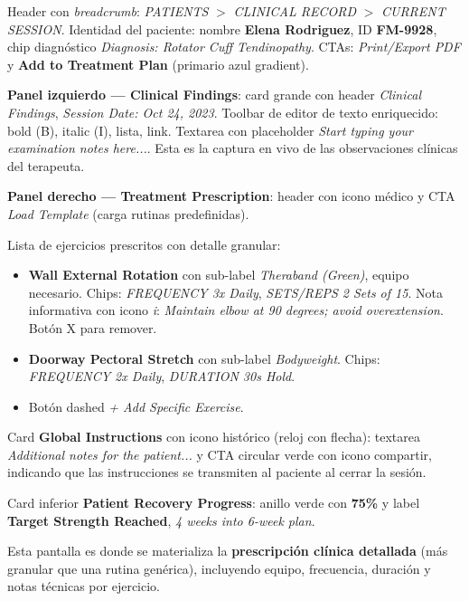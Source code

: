 Header con \textit{breadcrumb}: \textit{PATIENTS} $>$ \textit{CLINICAL RECORD} $>$ \textit{CURRENT SESSION}. Identidad del paciente: nombre \textbf{Elena Rodriguez}, ID \textbf{FM-9928}, chip diagnóstico \textit{Diagnosis: Rotator Cuff Tendinopathy}. CTAs: \textit{Print/Export PDF} y \textbf{Add to Treatment Plan} (primario azul gradient).

\textbf{Panel izquierdo --- Clinical Findings}: card grande con header \textit{Clinical Findings}, \textit{Session Date: Oct 24, 2023}. Toolbar de editor de texto enriquecido: bold (B), italic (I), lista, link. Textarea con placeholder \textit{Start typing your examination notes here...}. Esta es la captura en vivo de las observaciones clínicas del terapeuta.

\textbf{Panel derecho --- Treatment Prescription}: header con icono médico y CTA \textit{Load Template} (carga rutinas predefinidas).

Lista de ejercicios prescritos con detalle granular:

\begin{itemize}
  \item \textbf{Wall External Rotation} con sub-label \textit{Theraband (Green)}, equipo necesario. Chips: \textit{FREQUENCY 3x Daily}, \textit{SETS/REPS 2 Sets of 15}. Nota informativa con icono \textit{i}: \textit{Maintain elbow at 90 degrees; avoid overextension}. Botón X para remover.

  \item \textbf{Doorway Pectoral Stretch} con sub-label \textit{Bodyweight}. Chips: \textit{FREQUENCY 2x Daily}, \textit{DURATION 30s Hold}.

  \item Botón dashed \textit{+ Add Specific Exercise}.
\end{itemize}

Card \textbf{Global Instructions} con icono histórico (reloj con flecha): textarea \textit{Additional notes for the patient...} y CTA circular verde con icono compartir, indicando que las instrucciones se transmiten al paciente al cerrar la sesión.

Card inferior \textbf{Patient Recovery Progress}: anillo verde con \textbf{75\%} y label \textbf{Target Strength Reached}, \textit{4 weeks into 6-week plan}.

Esta pantalla es donde se materializa la \textbf{prescripción clínica detallada} (más granular que una rutina genérica), incluyendo equipo, frecuencia, duración y notas técnicas por ejercicio.

